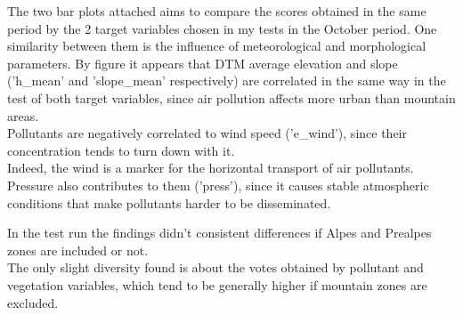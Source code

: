 The two bar plots attached aims to compare the scores obtained in the same period by the 2 target variables chosen in my tests in the October period.
One similarity between them is the influence of meteorological and morphological parameters.
By figure it appears that DTM average elevation and slope ('h\_mean' and 'slope\_mean' respectively) are correlated in the same way in the test of both target variables, since air pollution affects more urban than mountain areas.\\
Pollutants are negatively correlated to wind speed ('e\_wind'), since their concentration tends to turn down with it.\\ 
Indeed, the wind is a marker for the horizontal transport of air pollutants. Pressure also contributes to them ('press'), since it causes stable atmospheric conditions that make pollutants harder to be disseminated.
\par
In the test run the findings didn't  consistent differences if Alpes and Prealpes zones are included or not.\\
The only slight diversity found is about the votes obtained by pollutant and vegetation variables, which tend to be generally higher if mountain zones are excluded.
